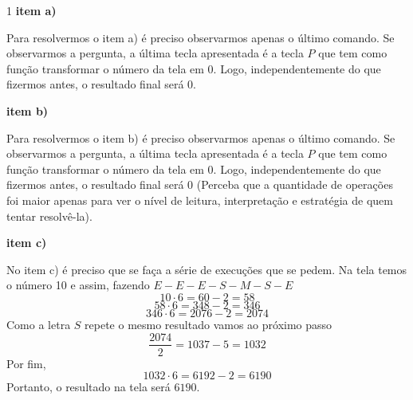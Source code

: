 \begin{solucoes}{1}
    \solucao
    \textbf{item a)}

    Para resolvermos o item a) é preciso observarmos apenas o último comando. Se observarmos a pergunta, a última tecla apresentada é a tecla $P$ que tem como função transformar o número da tela em 0. Logo, independentemente do que fizermos antes, o resultado final será 0. 

    \solucao
    \textbf{item b)}
    
       Para resolvermos o item b) é preciso observarmos apenas o último comando. Se observarmos a pergunta, a última tecla apresentada é a tecla $P$ que tem como função transformar o número da tela em 0. Logo, independentemente do que fizermos antes, o resultado final será 0 (Perceba que a quantidade de operações foi maior apenas para ver o nível de leitura, interpretação e estratégia de quem tentar resolvê-la).

\solucao
\textbf{item c)}

No item c) é preciso que se faça a série de execuções que se pedem. Na tela temos o número 10 e assim, fazendo $E-E-E-S-M-S-E$
\begin{equation*}
    10\cdot 6=60-2=58
\end{equation*}
\begin{equation*}
    58\cdot6=348-2=346
\end{equation*}
\begin{equation*}
    346\cdot 6=2076-2=2074 
\end{equation*}
Como a letra $S$ repete o mesmo resultado vamos ao próximo passo
\begin{equation*}
    \frac{2074}{2}=1037-5=1032
\end{equation*}
Por fim, 
\begin{equation*}
    1032\cdot6=6192-2=6190             
\end{equation*}
Portanto, o resultado na tela será $6190$.
       
\end{solucoes}


